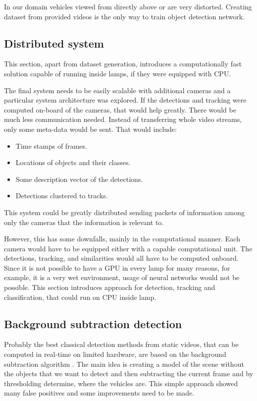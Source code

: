 \documentclass[a4paper,11pt,titlepage,twoside]{article}
\numberwithin{figure}{section}
\begin{document}
In our domain vehicles viewed from directly above or are very distorted. Creating dataset from provided videos is the only way to train object detection network. 

\subsection{Distributed system}
This section, apart from dataset generation, introduces a computationally fast solution capable of running inside lamps, if they were equipped with CPU. 

The final system needs to be easily scalable with additional cameras and a particular system architecture was explored. If the detections and tracking were computed on-board of the cameras, that would help greatly. There would be much less communication needed. Instead of transferring whole video streams, only some meta-data would be sent. That would include: 

\begin{itemize}
\item Time stamps of frames.
\item Locations of objects and their classes.
\item Some description vector of the detections.
\item Detections clustered to tracks.
\end{itemize}

This system could be greatly distributed sending packets of information among only the cameras that the information is relevant to.

However, this has some downfalls, mainly in the computational manner. Each camera would have to be equipped either with a capable computational unit. The detections, tracking, and similarities would all have to be computed onboard. Since it is not possible to have a GPU in every lamp for many reasons, for example, it is a very wet environment, usage of neural networks would not be possible. This section introduces approach for detection, tracking and classification, that could run on CPU inside lamp.

\subsection{Background subtraction detection}
\label{sec:bgs}

Probably the best classical detection methods from static videos, that can be computed in real-time on limited hardware, are based on the background subtraction algorithm \cite{piccardi2004background}. The main idea is creating a model of the scene without the objects that we want to detect and then subtracting the current frame and by thresholding determine, where the vehicles are. This simple approach showed many false positives and some improvements need to be made. 
\end{document}
